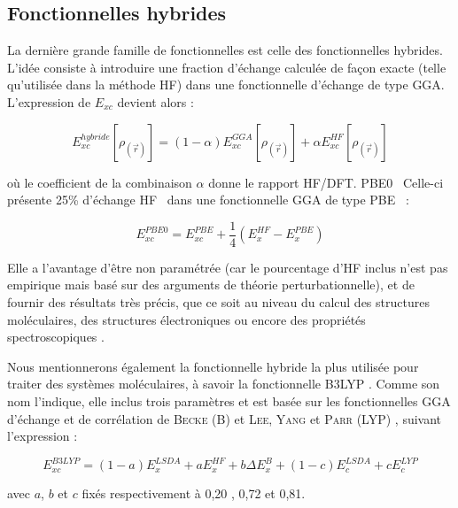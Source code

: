 \subsection{Fonctionnelles hybrides}

La dernière grande famille de fonctionnelles est celle des fonctionnelles hybrides. L’idée consiste à introduire une fraction d’échange calculée de façon exacte (telle qu’utilisée dans la méthode HF) dans une fonctionnelle d’échange de type GGA. L’expression de $E_{xc}$ devient alors :

\begin{equation}
E_{xc}^{hybride}[\rho_{(\vec{r})}] = (1- \alpha) E_{xc}^{GGA}[\rho_{(\vec{r})}] + \alpha E_{xc}^{HF}[\rho_{(\vec{r})}]
\end{equation}

\noindent où le coefficient de la combinaison $\alpha$ donne le rapport HF/DFT.
PBE0~\cite{adamo1999toward} Celle-ci présente 25\% d’échange HF~\cite{adamo1997toward} dans une fonctionnelle GGA de type PBE~\cite{perdew1996generalized} :

\begin{equation}
E_{xc}^{PBE0} = E_{xc}^{PBE} + \frac{1}{4} (E_{x}^{HF} - E_{x}^{PBE})
\end{equation}

Elle a l’avantage d’être non paramétrée (car le pourcentage d’HF inclus n’est pas empirique mais basé sur des arguments de théorie perturbationnelle), et de fournir des résultats très précis, que ce soit au niveau du calcul des structures moléculaires, des structures électroniques ou encore des propriétés spectroscopiques \cite{adamo1999toward}.

Nous mentionnerons également la fonctionnelle hybride la plus utilisée pour traiter des systèmes moléculaires, à savoir la fonctionnelle B3LYP \cite{becke1993density}. Comme son nom l’indique, elle inclus trois paramètres et est basée sur les fonctionnelles GGA d’échange et de corrélation de \textsc{Becke} (B) \cite{becke1988density} et \textsc{Lee}, \textsc{Yang} et \textsc{Parr} (LYP) \cite{chengteh1988development}, suivant l’expression :

\begin{equation}
E_{xc}^{B3LYP} = (1-a) E_{x}^{LSDA} + a E_{x}^{HF} + b \Delta E_{x}^{B} + (1-c) E_{c}^{LSDA} + c E_{c}^{LYP}
\label{B3LYP}
\end{equation}

\noindent avec $a$, $b$ et $c$ fixés respectivement à 0,20 , 0,72 et 0,81.


